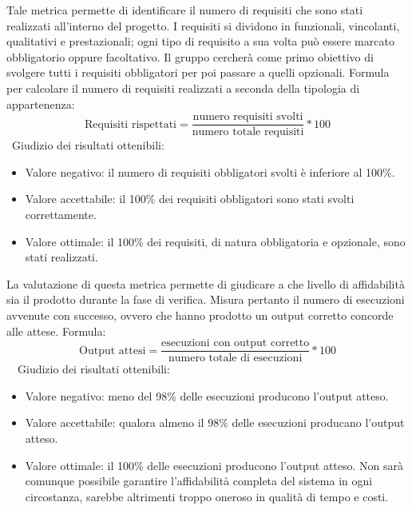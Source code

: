 \documentclass[a4paper, titlepage]{article}
\begin{document}
\label{par:req}
Tale metrica permette di identificare il numero di requisiti che sono stati realizzati all'interno del progetto.
\newline I requisiti si dividono in funzionali, vincolanti, qualitativi e prestazionali; ogni tipo di requisito a sua volta può essere marcato obbligatorio oppure facoltativo. Il gruppo cercherà come primo obiettivo di svolgere tutti i requisiti obbligatori per poi passare a quelli opzionali.
\newline Formula per calcolare il numero di requisiti realizzati a seconda della tipologia di appartenenza:
\begin{displaymath}
\mbox{Requisiti rispettati}=\frac{\mbox{numero requisiti svolti}}{\mbox{numero totale requisiti}}*100
\end{displaymath}
\
\newline Giudizio dei risultati ottenibili:
\begin{itemize}
\item Valore negativo: il numero di requisiti obbligatori svolti è inferiore al 100\%. 
\item Valore accettabile: il 100\% dei requisiti obbligatori sono stati svolti correttamente.
\item Valore ottimale: il 100\% dei requisiti, di natura obbligatoria e opzionale, sono stati realizzati.
\end{itemize}

\label{par:out}
La valutazione di questa metrica permette di giudicare a che livello di affidabilità sia il prodotto durante la fase di verifica.
Misura pertanto il numero di esecuzioni avvenute con successo, ovvero che hanno prodotto un output corretto concorde alle attese.
\newline Formula:
\begin{displaymath}
\mbox{Output attesi}=\frac{\mbox{esecuzioni con output corretto}}{\mbox{numero totale di esecuzioni}}*100
\end{displaymath}
\
\
\newline Giudizio dei risultati ottenibili:
\begin{itemize}
\item Valore negativo: meno del 98\% delle esecuzioni producono l'output atteso.
\item Valore accettabile: qualora almeno il 98\% delle esecuzioni producano l'output atteso.
\item Valore ottimale: il 100\% delle esecuzioni producono l'output atteso. Non sarà comunque possibile garantire l'affidabilità completa del sistema in ogni circostanza, sarebbe altrimenti troppo oneroso in qualità di tempo e costi.
\end{itemize}
\end{document}
